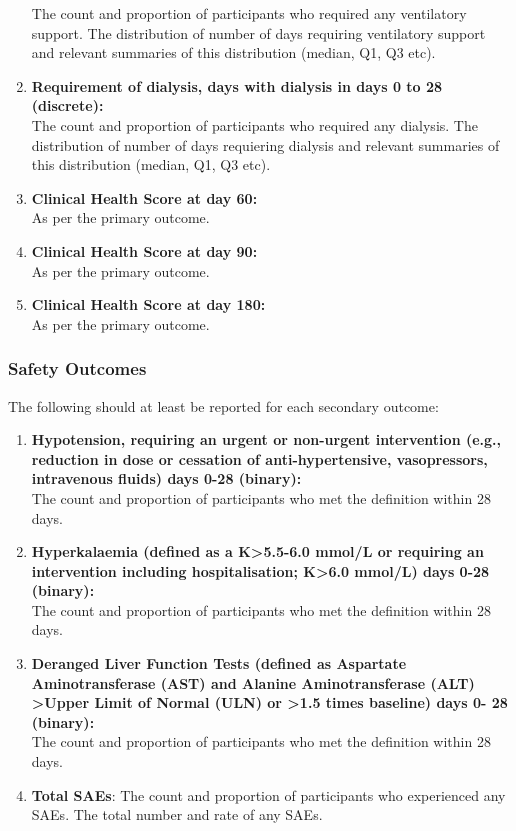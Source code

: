 \documentclass[11pt,parskip=half-]{scrartcl}
\begin{document}
\begin{enumerate}
        The count and proportion of participants who required any ventilatory support. The distribution of number of days requiring ventilatory support and relevant summaries of this distribution (median, Q1, Q3 etc).
    \item \textbf{Requirement of dialysis, days with dialysis in days 0 to 28 (discrete):} \\
        The count and proportion of participants who required any dialysis. The distribution of number of days requiering dialysis and relevant summaries of this distribution (median, Q1, Q3 etc).
    \item \textbf{Clinical Health Score at day 60:} \\
        As per the primary outcome.
    \item \textbf{Clinical Health Score at day 90:} \\
        As per the primary outcome.
    \item \textbf{Clinical Health Score at day 180:} \\
        As per the primary outcome.
\end{enumerate}

\subsubsection{Safety Outcomes}

The following should at least be reported for each secondary outcome:

\begin{enumerate}[resume]
    \item \textbf{Hypotension, requiring an urgent or non-urgent intervention (e.g., reduction in dose or cessation of anti-hypertensive, vasopressors, intravenous fluids) days 0-28 (binary):} \\
        The count and proportion of participants who met the definition within 28 days.
    \item  \textbf{Hyperkalaemia (defined as a K>5.5-6.0 mmol/L or requiring an intervention including hospitalisation; K>6.0 mmol/L) days 0-28 (binary):} \\ 
        The count and proportion of participants who met the definition within 28 days.
    \item \textbf{Deranged Liver Function Tests (defined as Aspartate Aminotransferase (AST) and Alanine Aminotransferase (ALT) >Upper Limit of Normal (ULN) or >1.5 times baseline) days 0- 28 (binary):} \\
        The count and proportion of participants who met the definition within 28 days.
    \item \textbf{Total SAEs}:
        The count and proportion of participants who experienced any SAEs. The total number and rate of any SAEs.
\end{enumerate}
\end{document}
